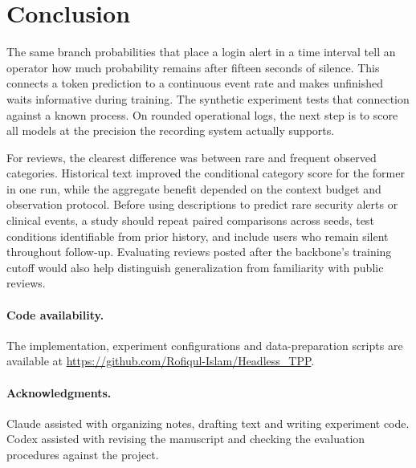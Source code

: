 \documentclass[sigconf,nonacm]{acmart}
\begin{document}
\section{Conclusion}
The same branch probabilities that place a login alert in a time interval tell an operator how much probability remains after fifteen seconds of silence. This connects a token prediction to a continuous event rate and makes unfinished waits informative during training. The synthetic experiment tests that connection against a known process. On rounded operational logs, the next step is to score all models at the precision the recording system actually supports.

For reviews, the clearest difference was between rare and frequent observed categories. Historical text improved the conditional category score for the former in one run, while the aggregate benefit depended on the context budget and observation protocol. Before using descriptions to predict rare security alerts or clinical events, a study should repeat paired comparisons across seeds, test conditions identifiable from prior history, and include users who remain silent throughout follow-up. Evaluating reviews posted after the backbone's training cutoff would also help distinguish generalization from familiarity with public reviews.

\paragraph{Code availability.} The implementation, experiment configurations and data-preparation scripts are available at \url{https://github.com/Rofiqul-Islam/Headless_TPP}.
\paragraph{Acknowledgments.} Claude assisted with organizing notes, drafting text and writing experiment code. Codex assisted with revising the manuscript and checking the evaluation procedures against the project.


\end{document}
